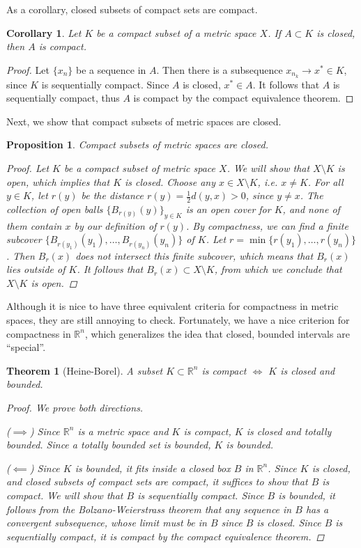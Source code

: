 \documentclass[12pt]{amsart}         %
\newtheorem{theorem}{Theorem}[section]
\newtheorem{proposition}{Proposition}[section]
\newtheorem{corollary}{Corollary}[section]
\theoremstyle{remark}
\newcommand{\R}{\mathbb{R}}
\begin{document}
As a corollary, closed subsets of compact sets are compact. 

\begin{corollary}
Let $K$ be a compact subset of a metric space $X$. If $A \subset K$ is closed, then $A$ is compact.
\end{corollary}
\begin{proof}
Let $\{x_n\}$ be a sequence in $A$. Then there is a subsequence $x_{n_k} \rightarrow x^* \in K$, since $K$ is sequentially compact. Since $A$ is closed, $x^* \in A$. It follows that $A$ is sequentially compact, thus $A$ is compact by the compact equivalence theorem.
\end{proof}

Next, we show that compact subsets of metric spaces are closed.

\begin{proposition}
Compact subsets of metric spaces are closed.
\begin{proof}
Let $K$ be a compact subset of metric space $X$. We will show that $X\setminus K$ is open, which implies that $K$ is closed. Choose any $x \in X\setminus K$, i.e. $x \neq K$. For all $y \in K$, let $r(y)$ be the distance $r(y) = \frac{1}{2}d(y, x) > 0$, since $y \neq x$. The collection of open balls $\{ B_{r(y)}(y) \}_{y \in K}$ is an open cover for $K$, and none of them contain $x$ by our definition of $r(y)$. By compactness, we can find a finite subcover $\{ B_{r(y_1)}(y_1), \dots, B_{r(y_n)}(y_n)\}$ of $K$. Let $r = \min\{ r(y_1), \dots, r(y_n) \}$. Then $B_r(x)$ does not intersect this finite subcover, which means that $B_r(x)$ lies outside of $K$. It follows that $B_r(x) \subset X\setminus K$, from which we conclude that $X\setminus K$ is open.
\end{proof}
\end{proposition}

Although it is nice to have three equivalent criteria for compactness in metric spaces, they are still annoying to check. Fortunately, we have a nice criterion for compactness in $\R^n$, which generalizes the idea that closed, bounded intervals are ``special''.

\begin{theorem}[Heine-Borel]
 A subset $K \subset \R^n$ is compact $\iff$ $K$ is closed and bounded.
\begin{proof}We prove both directions.

($\implies$) Since $\R^n$ is a metric space and $K$ is compact, $K$ is closed and totally bounded. Since a totally bounded set is bounded, $K$ is bounded.

($\impliedby$) Since $K$ is bounded, it fits inside a closed box $B$ in $\R^n$. Since $K$ is closed, and closed subsets of compact sets are compact, it suffices to show that $B$ is compact. We will show that $B$ is sequentially compact. Since $B$ is bounded, it follows from the Bolzano-Weierstrass theorem that any sequence in $B$ has a convergent subsequence, whose limit must be in $B$ since $B$ is closed. Since $B$ is sequentially compact, it is compact by the compact equivalence theorem.
\end{proof}
\end{theorem}
\end{document}

